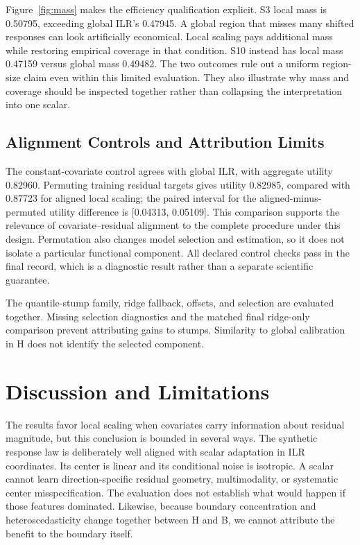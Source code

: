\documentclass{article}
\begin{document}
Figure~\ref{fig:mass} makes the efficiency qualification explicit. S3 local mass is 0.50795, exceeding global ILR's 0.47945. A global region that misses many shifted responses can look artificially economical. Local scaling pays additional mass while restoring empirical coverage in that condition. S10 instead has local mass 0.47159 versus global mass 0.49482. The two outcomes rule out a uniform region-size claim even within this limited evaluation. They also illustrate why mass and coverage should be inspected together rather than collapsing the interpretation into one scalar.

\subsection{Alignment Controls and Attribution Limits}
The constant-covariate control agrees with global ILR, with aggregate utility 0.82960. Permuting training residual targets gives utility 0.82985, compared with 0.87723 for aligned local scaling; the paired interval for the aligned-minus-permuted utility difference is [0.04313, 0.05109]. This comparison supports the relevance of covariate--residual alignment to the complete procedure under this design. Permutation also changes model selection and estimation, so it does not isolate a particular functional component. All declared control checks pass in the final record, which is a diagnostic result rather than a separate scientific guarantee.

The quantile-stump family, ridge fallback, offsets, and selection are evaluated together. Missing selection diagnostics and the matched final ridge-only comparison prevent attributing gains to stumps. Similarity to global calibration in H does not identify the selected component.

\section{Discussion and Limitations}
The results favor local scaling when covariates carry information about residual magnitude, but this conclusion is bounded in several ways. The synthetic response law is deliberately well aligned with scalar adaptation in ILR coordinates. Its center is linear and its conditional noise is isotropic. A scalar cannot learn direction-specific residual geometry, multimodality, or systematic center misspecification. The evaluation does not establish what would happen if those features dominated. Likewise, because boundary concentration and heteroscedasticity change together between H and B, we cannot attribute the benefit to the boundary itself.
\end{document}
